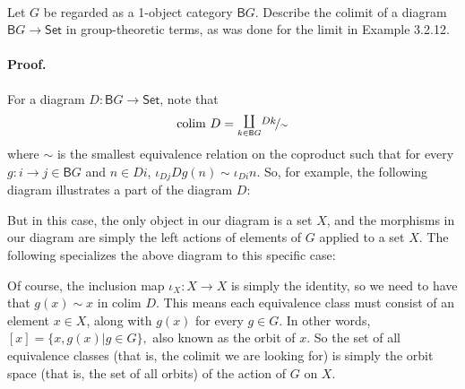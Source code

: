 \documentclass[main.tex]{subfiles}
\begin{document}
	
	\paragraph{} 
\begin{exercise}
	Let $ G $ be regarded as a 1-object category $ \mathsf{B}G $. Describe the colimit of a diagram $ \mathsf{B}G \to \mathsf{Set} $ in group-theoretic terms, as was done for the limit in Example 3.2.12.
\end{exercise}
	\paragraph{Proof.} 
	
	For a diagram $ D: \mathsf{B}G \to \mathsf{Set} $, note that 
	\[\mathrm{colim}\ D = {\large {\nicefrac{ \underset{k \in \mathsf{B}G}{\coprod} Dk}{\sim}}} \]
	where $ \sim $ is the smallest equivalence relation on the coproduct such that for every $ g: i \to j \in \mathsf{B}G $ and $ n \in Di $, $ \iota_{Dj} Dg(n) \sim \iota_{Di} n $. So, for example, the following diagram illustrates a part of the diagram $ D $:
	
	\begin{center}	 \end{center}

	But in this case, the only object in our diagram is a set $ X $, and the morphisms in our diagram are simply the left actions of elements of $ G $ applied to a set $ X. $ The following specializes the above diagram to this specific case: 

	\begin{center}\end{center}

	Of course, the inclusion map $ \iota_X: X \to X $ is simply the identity, so we need to have that $ g(x) \sim x $ in colim $ D $. This means each equivalence class must consist of an element $ x \in X $, along with $ g(x) $ for every $ g \in G $. In other words, $ [x] = \{x, g(x) | g \in G\}, $ also known as the orbit of $ x $. So the set of all equivalence classes (that is, the colimit we are looking for) is simply the orbit space (that is, the set of all orbits) of the action of $ G $ on $ X $.
		
\end{document}
